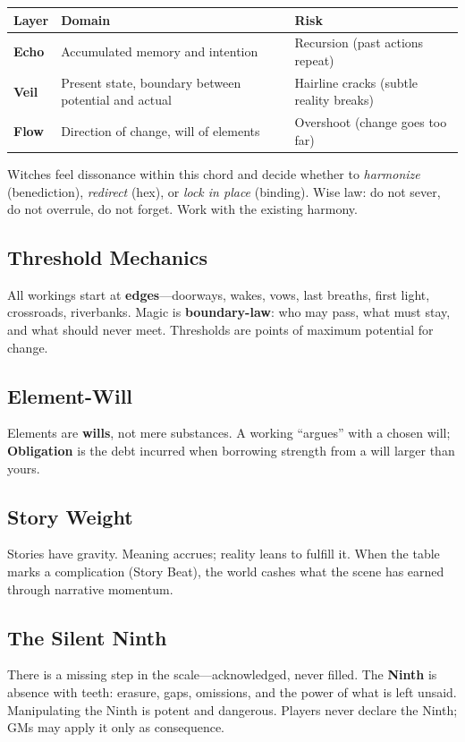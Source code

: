 \documentclass[11pt,letterpaper]{article}
\newcommand{\term}[1]{\textbf{#1}}
\begin{document}
\begin{table}[H]
\centering
\begin{tabularx}{0.9\linewidth}{@{}lXX@{}}
\toprule
\textbf{Layer} & \textbf{Domain} & \textbf{Risk} \\
\midrule
\textbf{Echo} & Accumulated memory and intention & Recursion (past actions repeat) \\
\textbf{Veil} & Present state, boundary between potential and actual & Hairline cracks (subtle reality breaks) \\
\textbf{Flow} & Direction of change, will of elements & Overshoot (change goes too far) \\
\bottomrule
\end{tabularx}
\end{table}

Witches feel dissonance within this chord and decide whether to \textit{harmonize} (benediction), \textit{redirect} (hex), or \textit{lock in place} (binding). Wise law: do not sever, do not overrule, do not forget. Work with the existing harmony.

\subsection{Threshold Mechanics}
All workings start at \term{edges}---doorways, wakes, vows, last breaths, first light, crossroads, riverbanks. Magic is \term{boundary-law}: who may pass, what must stay, and what should never meet. Thresholds are points of maximum potential for change.

\subsection{Element-Will}
Elements are \term{wills}, not mere substances. A working ``argues'' with a chosen will; \term{Obligation} is the debt incurred when borrowing strength from a will larger than yours.

\subsection{Story Weight}
Stories have gravity. Meaning accrues; reality leans to fulfill it. When the table marks a complication (Story Beat), the world cashes what the scene has earned through narrative momentum.

\subsection{The Silent Ninth}
There is a missing step in the scale---acknowledged, never filled. The \term{Ninth} is absence with teeth: erasure, gaps, omissions, and the power of what is left unsaid. Manipulating the Ninth is potent and dangerous. Players never declare the Ninth; GMs may apply it only as consequence.
\end{document}

